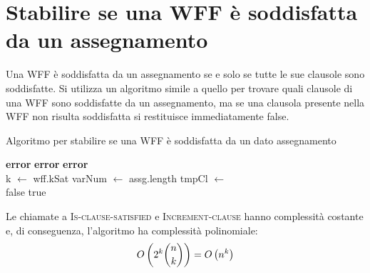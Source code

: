 \section{Stabilire se una WFF è soddisfatta da un assegnamento}
Una WFF è soddisfatta da un assegnamento se e solo se tutte le sue clausole sono soddisfatte.
Si utilizza un algoritmo simile a quello per trovare quali clausole
di una WFF sono soddisfatte da un assegnamento, ma se una clausola presente
nella WFF non risulta soddisfatta si restituisce immediatamente false.
\begin{algorithm}[H]
    \caption{Algoritmo per stabilire se una WFF è soddisfatta da un dato assegnamento}
    \label{alg:is_wff_satisfied}
    \begin{algorithmic}
                \State \textbf{error}
            \EndIf
                \State \textbf{error}
            \EndIf
                \State \textbf{error}
            \EndIf\\

            \State k $\gets$ wff.kSat
            \State varNum $\gets$ assg.length
            \State tmpCl $\gets$ \\

                    \State \Return false
                \EndIf
                \State {}
            \EndFor
            \State \Return true
        \EndProcedure
    \end{algorithmic}
\end{algorithm}
Le chiamate a \textsc{Is-clause-satisfied} e \textsc{Increment-clause} hanno complessità
costante e, di conseguenza, l'algoritmo ha complessità polinomiale:
\begin{equation*}
    O \left(2^k \binom{n}{k}\right) = O \left(n^k\right)
\end{equation*}


